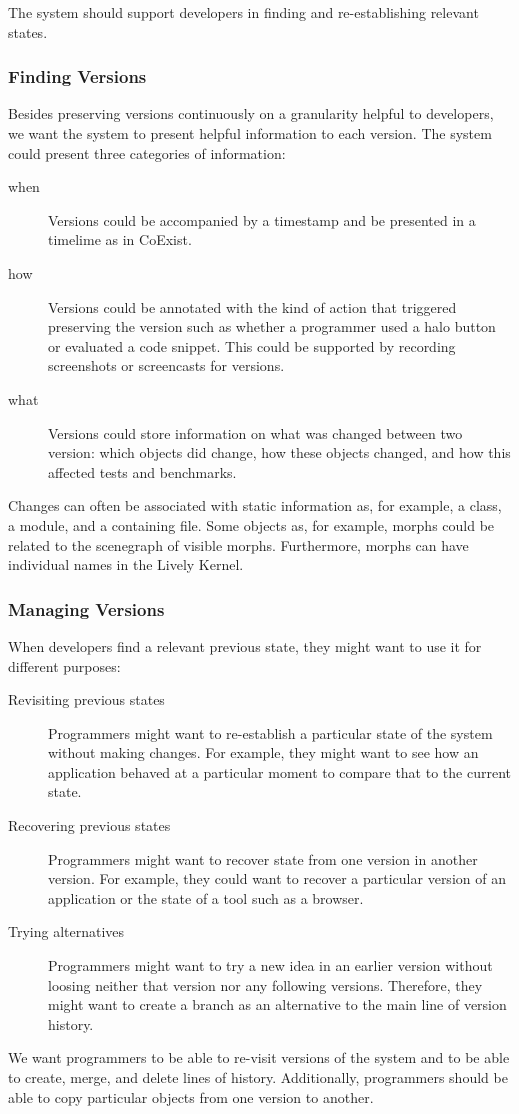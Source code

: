 The system should support developers in finding and re-establishing relevant states.

\subsubsection{Finding Versions}

Besides preserving versions continuously on a granularity helpful to developers, we want the system to present helpful information to each version.
The system could present three categories of information:

\begin{description}
    \item[when] Versions could be accompanied by a timestamp and be presented in a timelime as in CoExist.
    \item[how] Versions could be annotated with the kind of action that triggered preserving the version such as whether a programmer used a halo button or evaluated a code snippet. This could be supported by recording screenshots or screencasts for versions.
    \item[what] Versions could store information on what was changed between two version: which objects did change, how these objects changed, and how this affected tests and benchmarks.
\end{description}

Changes can often be associated with static information as, for example, a class, a module, and a containing file.
Some objects as, for example, morphs could be related to the scenegraph of visible morphs.
Furthermore, morphs can have individual names in the Lively Kernel.

\subsubsection{Managing Versions}

When developers find a relevant previous state, they might want to use it for different purposes:

\begin{description}
    \item[Revisiting previous states] Programmers might want to re-establish a particular state of the system without making changes. For example, they might want to see how an application behaved at a particular moment to compare that to the current state.
    \item[Recovering previous states] Programmers might want to recover state from one version in another version. For example, they could want to recover a particular version of an application or the state of a tool such as a browser.
    \item[Trying alternatives] Programmers might want to try a new idea in an earlier version without loosing neither that version nor any following versions. Therefore, they might want to create a branch as an alternative to the main line of version history.
\end{description}

We want programmers to be able to re-visit versions of the system and to be able to create, merge, and delete lines of history.
Additionally, programmers should be able to copy particular objects from one version to another.
